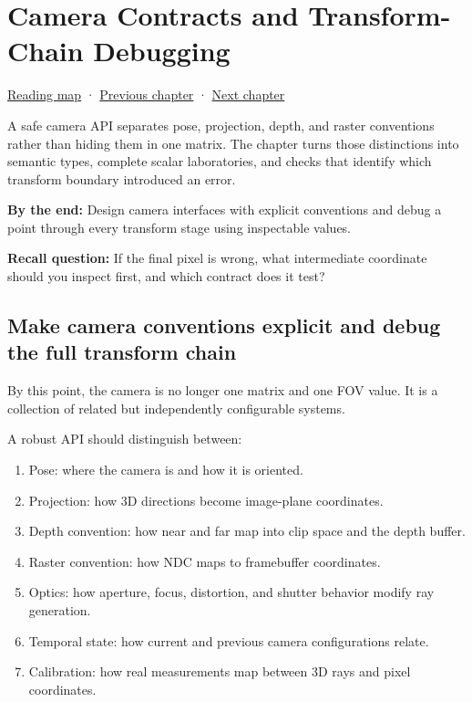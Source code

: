 \chapter{Camera Contracts and Transform-Chain Debugging}\label{02-foundations-ii-ch037-camera-contracts-and-transform-chain-debugging}\hypertarget{02-foundations-ii-ch037}{}\label{stagechapter:02-foundations-ii-ch037}

\hypertarget{02-foundations-ii-ch037-camera-contracts-and-transform-chain-debugging}{}

\hyperref[volume-reading-map]{Reading map} · \hyperref[02-foundations-ii-ch036-exposure-physical-optics-and-depth-of-field]{Previous chapter} · \hyperref[02-foundations-ii-ch038-reconstruct-the-complete-geometry-pipeline]{Next chapter}

A safe camera API separates pose, projection, depth, and raster conventions rather than hiding them in one matrix. The chapter turns those distinctions into semantic types, complete scalar laboratories, and checks that identify which transform boundary introduced an error.

\textbf{By the end:} Design camera interfaces with explicit conventions and debug a point through every transform stage using inspectable values.

\textbf{Recall question:} If the final pixel is wrong, what intermediate coordinate should you inspect first, and which contract does it test?

\section{Make camera conventions explicit and debug the full transform chain}\label{02-foundations-ii-ch037-make-camera-conventions-explicit-and-debug-the-full-transform-chain}

\hypertarget{02-foundations-ii-ch037-make-camera-conventions-explicit-and-debug-the-full-transform-chain}{}

By this point, the camera is no longer one matrix and one FOV value. It is a collection of related but independently configurable systems.

A robust API should distinguish between:

\begin{enumerate}
\def\labelenumi{\arabic{enumi}.}
\tightlist
\item
  Pose: where the camera is and how it is oriented.
\item
  Projection: how 3D directions become image-plane coordinates.
\item
  Depth convention: how near and far map into clip space and the depth buffer.
\item
  Raster convention: how NDC maps to framebuffer coordinates.
\item
  Optics: how aperture, focus, distortion, and shutter behavior modify ray generation.
\item
  Temporal state: how current and previous camera configurations relate.
\item
  Calibration: how real measurements map between 3D rays and pixel coordinates.
\end{enumerate}

